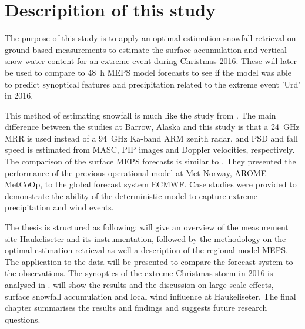 \section{Descripition of this study}
The purpose of this study is to apply an optimal-estimation snowfall retrieval on ground based measurements to estimate the surface accumulation and vertical snow water content for an extreme event during Christmas 2016. These will later be used to compare to \SI{48}{\hour} MEPS model forecasts to see if the model was able to predict synoptical features and precipitation related to the extreme event 'Urd' in 2016. 
\par\medskip
\noindent
This method of estimating snowfall is much like the study from \citet{cooper_variational_2017}. The main difference between the studies at Barrow, Alaska and this study is that a \SI{24}{\giga\hertz} MRR is used instead of a \SI{94}{\giga\hertz} Ka-band ARM zenith radar, and PSD and fall speed is estimated from MASC, PIP images and Doppler velocities, respectively.
\\
The comparison of the surface MEPS forecasts is similar to \citet{muller_arome-metcoop:_2017}. They presented the performance of the previous operational model at Met-Norway, AROME-MetCoOp, to the global forecast system ECMWF. Case studies were provided to demonstrate the ability of the deterministic model to capture extreme precipitation and wind events. 
\par\medskip
\noindent
The thesis is structured as following:  will give an overview of the measurement site Haukeliseter and its instrumentation, followed by the methodology on the optimal estimation retrieval as well a description of the regional model MEPS. The application to the data will be presented to compare the forecast system to the observations. The synoptics of the extreme Christmas storm in 2016 is analysed in .  will show the results and the discussion on large scale effects, surface snowfall accumulation and local wind influence  at Haukeliseter. The final chapter summarises the results and findings and suggests future research questions.